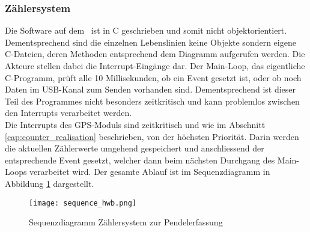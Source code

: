 	\subsubsection{Zählersystem}
	Die Software auf dem \hwb\ ist in C geschrieben und somit nicht objektorientiert. Dementsprechend sind die einzelnen Lebenslinien keine Objekte sondern eigene C-Dateien, deren Methoden entsprechend dem Diagramm aufgerufen werden. Die Akteure stellen dabei die Interrupt-Eingänge dar.
	\noindent Der Main-Loop, das eigentliche C-Programm, prüft alle 10 Millisekunden, ob ein Event gesetzt ist, oder ob noch Daten im USB-Kanal zum Senden vorhanden sind. Dementsprechend ist dieser Teil des Programmes nicht besonders zeitkritisch und kann problemlos zwischen den Interrupts verarbeitet werden.\\
	Die Interrupts des GPS-Moduls sind zeitkritisch und wie im Abschnitt \ref{cap:counter_realisation} beschrieben, von der höchsten Priorität. Darin werden die aktuellen Zählerwerte umgehend gespeichert und anschliessend der entsprechende Event gesetzt, welcher dann beim nächsten Durchgang des Main-Loops verarbeitet wird.
    Der gesamte Ablauf ist im Sequenzdiagramm in Abbildung \ref{fig:sequence_hwb} dargestellt.
 	\begin{figure}[H]
   		\centering
        \texttt{[image: sequence\_hwb.png]}
        \caption{Sequenzdiagramm Zählersystem zur Pendelerfassung}
        \label{fig:sequence_hwb}
    \end{figure}